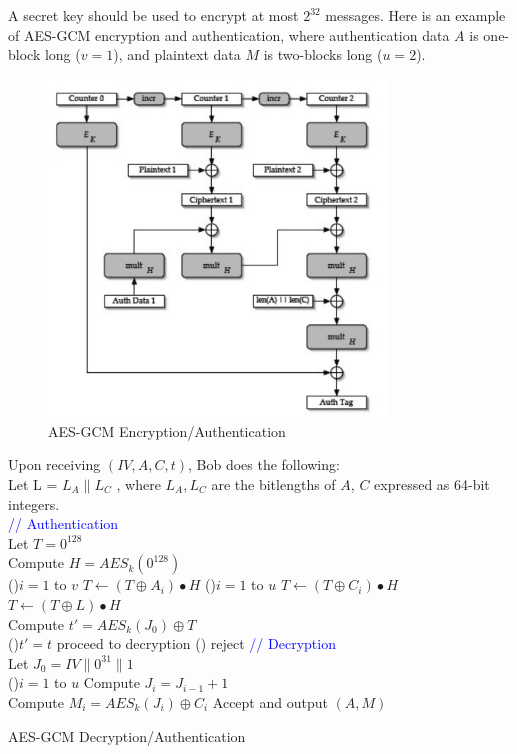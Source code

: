 \documentclass[12pt,titlepage]{article}
\begin{document}
A secret key should be used to encrypt at most $2^{32}$ messages.
\newpage
Here is an example of AES-GCM encryption and authentication, where authentication data $A$ is one-block long ($v = 1$), and plaintext data $M$ is two-blocks long ($u = 2$).
\begin{center}
	\begin{figure}[h!]
		\centering
		\includegraphics[width=0.8\textwidth]{AES_GCM.png}
		\caption{AES-GCM Encryption/Authentication}
	\end{figure}
\end{center}
\newpage
\begin{algorithm}
	Upon receiving $(IV, A, C, t)$, Bob does the following:\\
	Let L = $L_A \| L_C$ , where $L_A , L_C$ are the bitlengths of $A$, $C$ expressed as 64-bit integers.\\
	\textcolor{blue}{// Authentication}\\
	Let $T = 0^{128}$\\
	Compute $H = AES_k (0^{128})$\\
	\For(){$i = 1$ to $v$}{
		$T \leftarrow (T \oplus A_i) \bullet H$
	}
	\For(){$i = 1$ to $u$}{
		$T \leftarrow (T \oplus C_i) \bullet H$
	}
	$T \leftarrow (T \oplus L) \bullet H$\\
	Compute $t' = AES_k (J_0) \oplus T$\\
	\If(){$t' = t$}{
		proceed to decryption
	} \Else(){
		reject
	}
	\textcolor{blue}{// Decryption}\\
	Let $J_0 = IV \| 0^{31} \| 1$\\
	\For(){$i = 1$ to $u$}{
		Compute $J_i = J_{i-1} + 1$\\
		Compute $M_i = AES_k (J_i) \oplus C_i$
	}
	Accept and output $(A, M)$
	\caption{AES-GCM Decryption/Authentication}
\end{algorithm}
\end{document}
